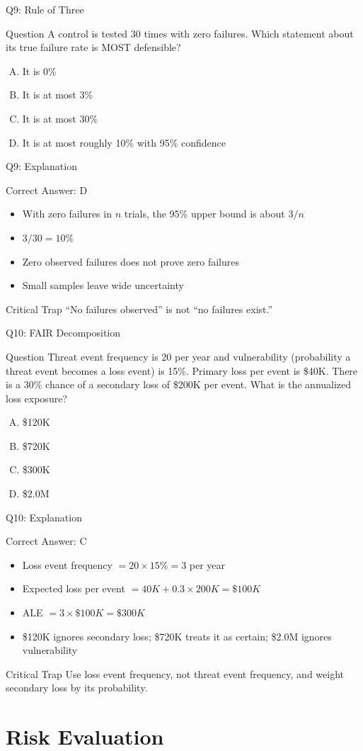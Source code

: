 \documentclass[aspectratio=169]{beamer}
\newcommand{\hq}[7]{%
  \begin{frame}{Q#1: #2}
    \begin{block}{Question}
      #3
    \end{block}
    \begin{enumerate}[(A)]
      #4
    \end{enumerate}
  \end{frame}
  \begin{frame}{Q#1: Explanation}
    \begin{block}{Correct Answer: #5}
      \begin{itemize}
        #6
      \end{itemize}
    \end{block}
    \begin{alertblock}{Critical Trap}
      #7
    \end{alertblock}
  \end{frame}
}
\begin{document}
\hq{9}{Rule of Three}
{A control is tested 30 times with zero failures. Which statement about its true failure rate is MOST defensible?}
{\item It is 0\%
 \item It is at most 3\%
 \item It is at most 30\%
 \item It is at most roughly 10\% with 95\% confidence}
{D}
{\item With zero failures in $n$ trials, the 95\% upper bound is about $3/n$
 \item $3/30 = 10\%$
 \item Zero observed failures does not prove zero failures
 \item Small samples leave wide uncertainty}
{``No failures observed'' is not ``no failures exist.''}

\hq{10}{FAIR Decomposition}
{Threat event frequency is 20 per year and vulnerability (probability a threat event becomes a loss event) is 15\%. Primary loss per event is \$40K. There is a 30\% chance of a secondary loss of \$200K per event. What is the annualized loss exposure?}
{\item \$120K
 \item \$720K
 \item \$300K
 \item \$2.0M}
{C}
{\item Loss event frequency $= 20 \times 15\% = 3$ per year
 \item Expected loss per event $= 40K + 0.3 \times 200K = \$100K$
 \item ALE $= 3 \times \$100K = \$300K$
 \item \$120K ignores secondary loss; \$720K treats it as certain; \$2.0M ignores vulnerability}
{Use loss event frequency, not threat event frequency, and weight secondary loss by its probability.}

\section{Risk Evaluation}
\end{document}
